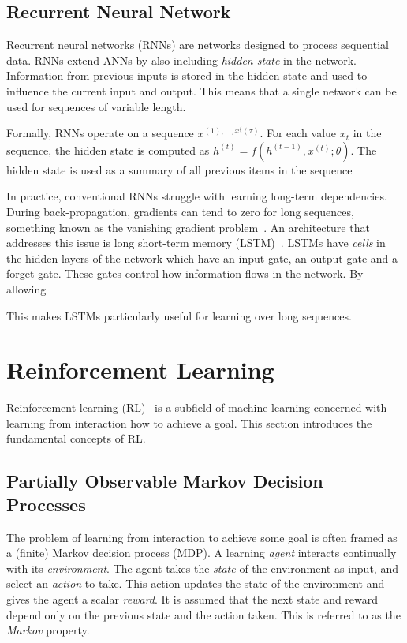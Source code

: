 \subsection{Recurrent Neural Network}

Recurrent neural networks (RNNs) are networks designed to process sequential data.
RNNs extend ANNs by also including \textit{hidden state} in the network.
Information from previous inputs is stored in the hidden state and used to influence the current input and output.
This means that a single network can be used for sequences of variable length.

Formally, RNNs operate on a sequence \(x^{(1), \dots, x^\{(\tau)}\).
For each value \(x_t\) in the sequence, the hidden state is computed as \(h^{(t)} = f(h^{(t-1)}, x^{(t)}; \theta)\).
The hidden state is used as a summary of all previous items in the sequence 



In practice, conventional RNNs struggle with learning long-term dependencies.
During back-propagation, gradients can tend to zero for long sequences, something known as the vanishing gradient problem~\cite{goodfellow_deep_2016}.
An architecture that addresses this issue is long short-term memory (LSTM)~\cite{hochreiter_schmidhuber_lstm_1997}.
LSTMs have \textit{cells} in the hidden layers of the network which have an input gate, an output gate and a forget gate.
These gates control how information flows in the network.
By allowing 


This makes LSTMs particularly useful for learning over long sequences.

\section{Reinforcement Learning}

Reinforcement learning (RL)~\cite{sutton_reinforcement_2018} is a subfield of machine learning concerned with learning from interaction how to achieve a goal.
This section introduces the fundamental concepts of RL.

\subsection{Partially Observable Markov Decision Processes}

The problem of learning from interaction to achieve some goal is often framed as a (finite) Markov decision process (MDP).
A learning \textit{agent} interacts continually with its \textit{environment}.
The agent takes the \textit{state} of the environment as input, and select an \textit{action} to take.
This action updates the state of the environment and gives the agent a scalar \textit{reward}.
It is assumed that the next state and reward depend only on the previous state and the action taken.
This is referred to as the \textit{Markov} property.~\cite{kaelbling_pomdp_1998}

